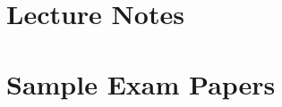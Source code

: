 \documentclass{hdnotes}
\begin{document}
\part{Lecture Notes}









\part{Sample Exam Papers}


\end{document}
